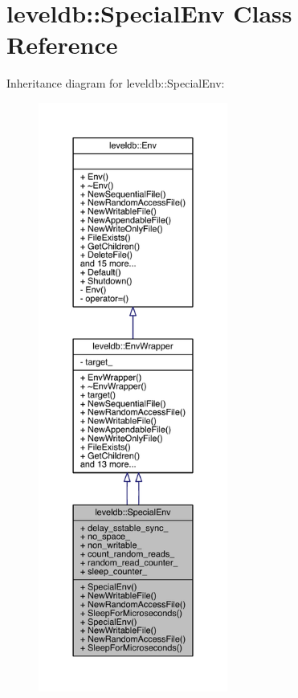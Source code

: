 \hypertarget{classleveldb_1_1_special_env}{}\section{leveldb\+:\+:Special\+Env Class Reference}
\label{classleveldb_1_1_special_env}


Inheritance diagram for leveldb\+:\+:Special\+Env\+:\nopagebreak
\begin{figure}[H]
\begin{center}
\leavevmode
\includegraphics[height=550pt]{classleveldb_1_1_special_env__inherit__graph}
\end{center}
\end{figure}


